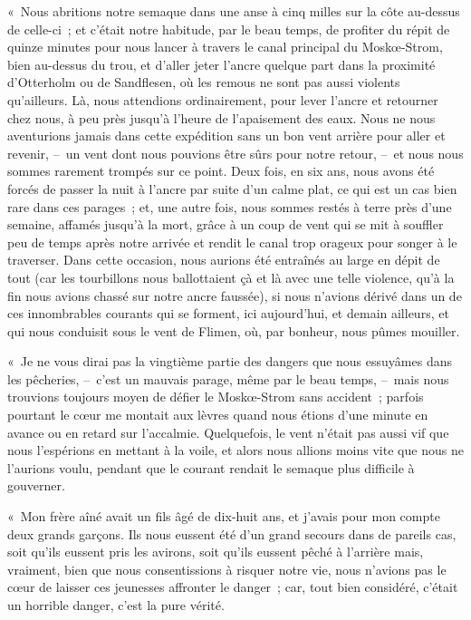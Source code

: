 \documentclass[french,twoside]{book} %
\begin{document}
« Nous abritions notre semaque dans une anse à cinq milles sur la côte au-dessus de celle-ci ; et c’était notre habitude, par le beau temps, de profiter du répit de quinze minutes pour nous lancer à travers le canal principal du Moskœ-Strom, bien au-dessus du trou, et d’aller jeter l’ancre quelque part dans la proximité d’Otterholm ou de Sandflesen, où les remous ne sont pas aussi violents qu’ailleurs. Là, nous attendions ordinairement, pour lever l’ancre et retourner chez nous, à peu près jusqu’à l’heure de l’apaisement des eaux. Nous ne nous aventurions jamais dans cette expédition sans un bon vent arrière pour aller et revenir, – un vent dont nous pouvions être sûrs pour notre retour, – et nous nous sommes rarement trompés sur ce point. Deux fois, en six ans, nous avons été forcés de passer la nuit à l’ancre par suite d’un calme plat, ce qui est un cas bien rare dans ces parages ; et, une autre fois, nous sommes restés à terre près d’une semaine, affamés jusqu’à la mort, grâce à un coup de vent qui se mit à souffler peu de temps après notre arrivée et rendit le canal trop orageux pour songer à le traverser. Dans cette occasion, nous aurions été entraînés au large en dépit de tout (car les tourbillons nous ballottaient çà et là avec une telle violence, qu’à la fin nous avions chassé sur notre ancre faussée), si nous n’avions dérivé dans un de ces innombrables courants qui se forment, ici aujourd’hui, et demain ailleurs, et qui nous conduisit sous le vent de Flimen, où, par bonheur, nous pûmes mouiller.\par
« Je ne vous dirai pas la vingtième partie des dangers que nous essuyâmes dans les pêcheries, – c’est un mauvais parage, même par le beau temps, – mais nous trouvions toujours moyen de défier le Moskœ-Strom sans accident ; parfois pourtant le cœur me montait aux lèvres quand nous étions d’une minute en avance ou en retard sur l’accalmie. Quelquefois, le vent n’était pas aussi vif que nous l’espérions en mettant à la voile, et alors nous allions moins vite que nous ne l’aurions voulu, pendant que le courant rendait le semaque plus difficile à gouverner.\par
« Mon frère aîné avait un fils âgé de dix-huit ans, et j’avais pour mon compte deux grands garçons. Ils nous eussent été d’un grand secours dans de pareils cas, soit qu’ils eussent pris les avirons, soit qu’ils eussent pêché à l’arrière mais, vraiment, bien que nous consentissions à risquer notre vie, nous n’avions pas le cœur de laisser ces jeunesses affronter le danger ; car, tout bien considéré, c’était un horrible danger, c’est la pure vérité.\par
\end{document}
